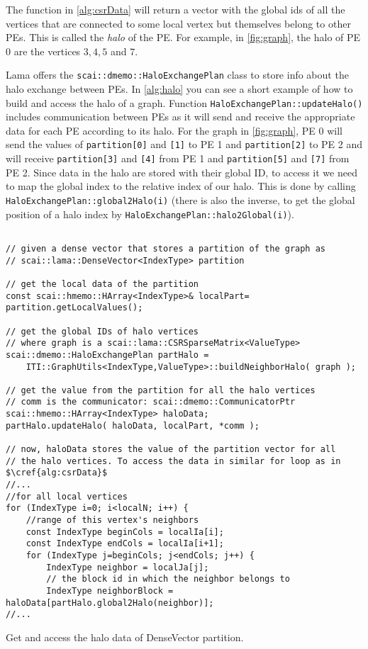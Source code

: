 \documentclass[a4paper,10pt]{article}
\newcommand{\MI}[1]{\texttt{#1}}
\begin{document}
The function in \cref{alg:csrData} will return a vector with the global ids of all the vertices 
that are connected to some local vertex but themselves belong to other PEs.
This is called the \emph{halo} of the PE. For example, in \cref{fig:graph}, the halo of PE 0
are the vertices $3, 4, 5$ and $7$.

Lama offers the \MI{scai::dmemo::HaloExchangePlan} class to store info about the halo 
exchange between PEs. In \cref{alg:halo} you can see a short example of how to build and access 
the halo of a graph. 
Function \MI{HaloExchangePlan::updateHalo()} includes communication between PEs as it
will send and receive the appropriate data for each PE according to its halo.
For the graph in \cref{fig:graph}, PE 0 will send the values of \MI{partition[0]} and \MI{[1]}
to PE 1 and \MI{partition[2]} to PE 2 and will receive \MI{partition[3]} and \MI{[4]} from
PE 1 and \MI{partition[5]} and \MI{[7]} from PE 2. Since data in the halo are stored with their
global ID, to access it we need to map the global index to the relative index of our halo.
This is done by calling \MI{HaloExchangePlan::global2Halo(i)} (there is also the inverse,
to get the global position of a halo index by \MI{HaloExchangePlan::halo2Global(i)}).

\begin{algorithm}
\begin{verbatim}

// given a dense vector that stores a partition of the graph as
// scai::lama::DenseVector<IndexType> partition

// get the local data of the partition
const scai::hmemo::HArray<IndexType>& localPart= partition.getLocalValues();

// get the global IDs of halo vertices
// where graph is a scai::lama::CSRSparseMatrix<ValueType>
scai::dmemo::HaloExchangePlan partHalo = 
	ITI::GraphUtils<IndexType,ValueType>::buildNeighborHalo( graph );

// get the value from the partition for all the halo vertices
// comm is the communicator: scai::dmemo::CommunicatorPtr
scai::hmemo::HArray<IndexType> haloData;
partHalo.updateHalo( haloData, localPart, *comm );	

// now, haloData stores the value of the partition vector for all
// the halo vertices. To access the data in similar for loop as in $\cref{alg:csrData}$
//...
//for all local vertices
for (IndexType i=0; i<localN; i++) {
	//range of this vertex's neighbors
	const IndexType beginCols = localIa[i];
	const IndexType endCols = localIa[i+1];
	for (IndexType j=beginCols; j<endCols; j++) {
		IndexType neighbor = localJa[j];
		// the block id in which the neighbor belongs to
		IndexType neighborBlock = haloData[partHalo.global2Halo(neighbor)];
//...
\end{verbatim}
\caption{Get and access the halo data of DenseVector partition.}
\label{alg:halo}
\end{algorithm}
\end{document}
